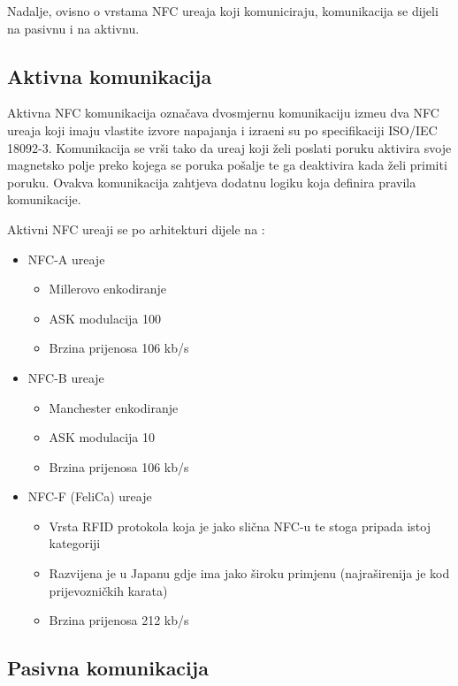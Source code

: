 Nadalje, ovisno o vrstama NFC ure\dj aja koji komuniciraju, komunikacija se dijeli na pasivnu i na aktivnu.


\subsection{Aktivna komunikacija}

Aktivna NFC komunikacija ozna\v{c}ava dvosmjernu komunikaciju izme\dj u dva NFC ure\dj aja koji imaju vlastite izvore napajanja i izra\dj eni su po specifikaciji ISO/IEC 18092-3. Komunikacija se vr\v{s}i tako da ure\dj aj koji \v{z}eli poslati poruku aktivira svoje magnetsko polje preko kojega se poruka po\v{s}alje te ga deaktivira kada \v{z}eli primiti poruku. Ovakva komunikacija zahtjeva dodatnu logiku koja definira pravila komunikacije.

Aktivni NFC ure\dj aji se po arhitekturi dijele na \cite{nfc_types}:

\begin{itemize}
	\item NFC-A ure\dj aje
	\begin{itemize}
		\item Millerovo enkodiranje
		\item ASK modulacija 100%
		\item Brzina prijenosa 106 kb/s
	\end{itemize}

	\item NFC-B ure\dj aje
	\begin{itemize}
		\item Manchester enkodiranje
		\item ASK modulacija 10%
		\item Brzina prijenosa 106 kb/s
	\end{itemize}

	\item NFC-F (FeliCa) ure\dj aje
	\begin{itemize}
		\item Vrsta RFID protokola koja je jako sli\v{c}na NFC-u te stoga pripada istoj kategoriji
		\item Razvijena je u Japanu gdje ima jako \v{s}iroku primjenu (najra\v{s}irenija je kod prijevozni\v{c}kih karata)
		\item  Brzina prijenosa 212 kb/s
	\end{itemize}
\end{itemize}


\subsection{Pasivna komunikacija}

